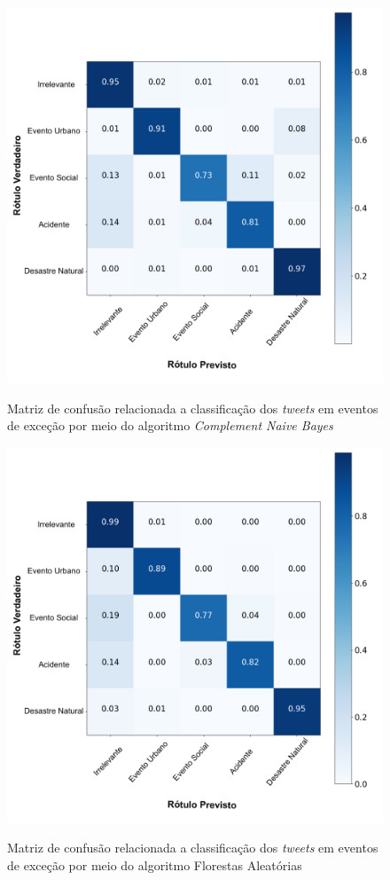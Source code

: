 \documentclass[
	12pt,				%
	oneside,			%
	a4paper,			%
	english,			%
	brazil				%
	]{abntex2ppgsi}
\begin{document}
{{{\begin{apendicesenv}
\begin{figure}[!htb]
	\centering
 	  \caption{Matriz de confusão relacionada a classificação dos \textit{tweets} em eventos de exceção por meio do algoritmo \textit{Complement Naive Bayes}}
		\includegraphics[width=1\linewidth]{images/confusion_matrix_cnb_pt.png}
	\label{fig:confusion_matrix_gnb}
\end{figure}

\begin{figure}[!htb]
	\centering
 	  \caption{Matriz de confusão relacionada a classificação dos \textit{tweets} em eventos de exceção por meio do algoritmo Florestas Aleatórias}
		\includegraphics[width=1\linewidth]{images/confusion_matrix_rf_pt.png}
	\label{fig:confusion_matrix_rf}
\end{figure}


\end{apendicesenv}}}}
\end{document}
